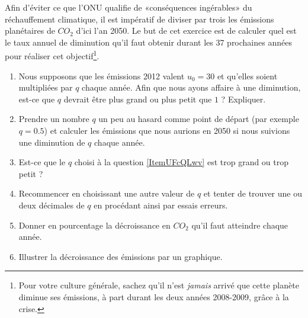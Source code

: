 
\begin{exercice}\label{exosmath-0304}

    Afin d'éviter ce que l'ONU qualifie de «conséquences ingérables» du réchauffement climatique, il est impératif de diviser par trois les émissions planétaires de \( CO_2\) d'ici l'an 2050\cite{KXZPUlP}. Le but de cet exercice est de calculer quel est le taux annuel de diminution qu'il faut obtenir durant les 37 prochaines années pour réaliser cet objectif\footnote{Pour votre culture générale, sachez qu'il n'est \emph{jamais} arrivé que cette planète diminue ses émissions, à part durant les deux années 2008-2009, grâce à la crise.}.

    \begin{enumerate}
        \item
            Nous supposons que les émissions 2012 valent \( u_0=\)\unit{30}{\giga\ton}\cite{XZZqclR} et qu'elles soient multipliées par \( q\) chaque année. Afin que nous ayons affaire à une diminution, est-ce que \( q\) devrait être plus grand ou plus petit que \( 1\) ? Expliquer.
        \item   \label{ItemUFcQLwv}
            Prendre un nombre \( q\) un peu au hasard comme point de départ (par exemple \( q=0.5\)) et calculer les émissions que nous aurions en 2050 si nous suivions une diminution de \( q\) chaque année.
        \item
            Est-ce que le \( q\) choisi à la question \ref{ItemUFcQLwv} est trop grand ou trop petit ?
        \item
            Recommencer en choisissant une autre valeur de \( q\) et tenter de trouver une ou deux décimales de \( q\) en procédant ainsi par essais erreurs.
        \item
            Donner en pourcentage la décroissance en \( CO_2\) qu'il faut atteindre chaque année.
        \item
            Illustrer la décroissance des émissions par un graphique.
    \end{enumerate}

\end{exercice}
